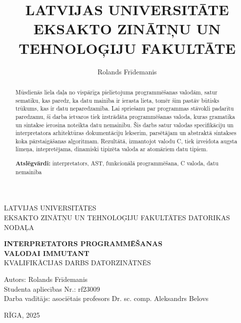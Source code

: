 \documentclass[12pt,a4paper]{report}
\title{LATVIJAS UNIVERSITĀTE
EKSAKTO ZINĀTŅU UN TEHNOLOĢIJU FAKULTĀTE}
\author{Rolands Frīdemanis}
\begin{document}
\begin{titlepage}
    \centering
    
    {\Large LATVIJAS UNIVERSITĀTES\\EKSAKTO ZINĀTŅU UN TEHNOLOĢIJU FAKULTĀTES DATORIKAS NODAĻA\\[5cm]}
    
    {\LARGE \textbf{ INTERPRETATORS PROGRAMMĒŠANAS\\[0.3cm] VALODAI IMMUTANT}}\\[0.5cm]

    \normalsize{KVALIFIKĀCIJAS DARBS DATORZINĀTNĒS}\\[5cm]
    
    \begin{flushleft}
        Autors: Rolands Frīdemanis\\
        Studenta apliecības Nr.: rf23009\\
        Darba vadītājs: asociētais profesors Dr. sc. comp. Aleksandrs Belovs
    \end{flushleft}
    
    \vfill
    RĪGA, 2025
\end{titlepage}

\begin{abstract}
    Mūsdienās liela daļa no vispārīga pielietojuma programmēšanas valodām, satur sematiku, kas paredz, ka datu mainība ir ierasta lieta, tomēr šim pastāv būtisks trūkums, kas ir datu neparedzamība.
    Lai spriešanu par programmas stāvokli padarītu paredzamu, šī darba ietvaros tiek izstrādāta programmēšanas valoda, kuras gramatika un sintakse ierosina noteikta datu nemainību.
    Šis darbs satur valodas specifikāciju un interpretatora arhitektūras dokumentāciju lekserim, parsētājam un abstraktā sintakses koka pārstaigāšanas algoritmam.
    Rezultātā, izmantojot valodu C, tiek izveidota augsta līmeņa, intepretējama, dinamiski tipizēta valoda ar atomāriem datu tipiem.

    \begin{flushleft}
    \textbf{Atslēgvārdi:} interpretators, AST, funkcionālā programmēšana, C valoda, datu nemainība
    \end{flushleft}
\end{abstract} 
\end{document}
